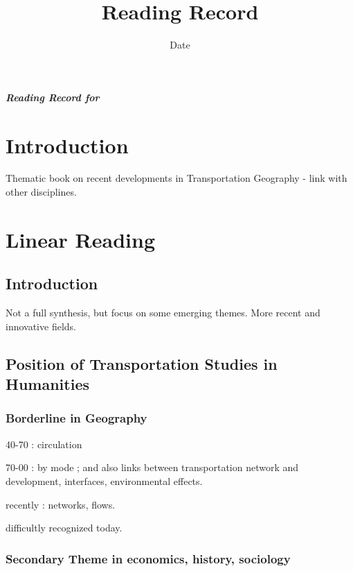 


\title{Reading Record\bigskip\\
\cite{emangard2009transports}
}
\author{}
\date{Date}


\maketitle

\textbf{\textit{Reading Record for \cite{emangard2009transports}}}




\section{Introduction}

Thematic book on recent developments in Transportation Geography - link with other disciplines.



\section{Linear Reading}

\subsection*{Introduction}

Not a full synthesis, but focus on some emerging themes. More recent and innovative fields.


\subsection{Position of Transportation Studies in Humanities}

\subsubsection{Borderline in Geography}

40-70 : circulation

70-00 : by mode ; and also links between transportation network and development, interfaces, environmental effects.

recently : networks, flows.

difficultly recognized today.

\subsubsection{Secondary Theme in economics, history, sociology}

